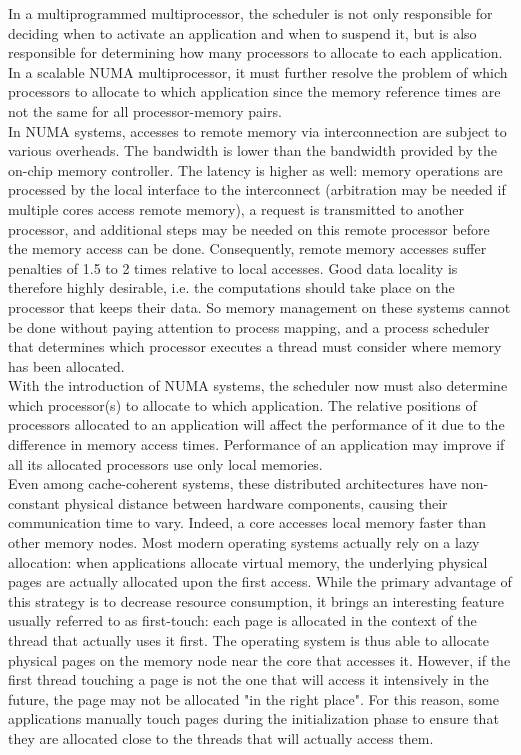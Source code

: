 \documentclass[a4paper,10pt]{article}
\begin{document}
\begin{multicols}{2}
In a multiprogrammed multiprocessor, the scheduler is not only responsible for deciding when to activate an application and when to suspend it, but is also responsible for determining how many processors to allocate to each application. In a scalable NUMA multiprocessor, it must further resolve the problem of which processors to allocate to which application since the memory reference times are not the same for all processor-memory pairs.\\
In NUMA systems, accesses to remote memory via interconnection are subject to various overheads. The bandwidth is lower than the bandwidth provided by the on-chip memory controller. The latency is higher as well: memory operations are processed by the local interface to the interconnect (arbitration may be needed if multiple cores access remote memory), a request is transmitted to another processor, and additional steps may be needed on this remote processor before the memory access can be done. Consequently, remote memory accesses suffer penalties of 1.5 to 2 times relative to local accesses. Good data locality is therefore highly desirable, i.e. the computations should take place on the processor that keeps their data. So memory management on these systems cannot be done without paying attention to process mapping, and a process scheduler that determines which processor executes a thread must consider where memory has been allocated.\\
With the introduction of NUMA systems, the scheduler now must also determine which processor(s) to allocate to which application. The relative positions of processors allocated to an application will affect the performance of it due to the difference in memory access times. Performance of an application may improve if all its allocated processors use only local memories.\\
Even among cache-coherent systems, these distributed architectures have non-constant physical distance between hardware components, causing their communication time to vary. Indeed, a core accesses local memory faster than other memory nodes. Most modern operating systems actually rely on a lazy allocation: when applications allocate virtual memory, the underlying physical pages are actually allocated upon the first access. While the primary advantage of this strategy is to decrease resource consumption, it brings an interesting feature usually referred to as first-touch: each page is allocated in the context of the thread that actually uses it first. The operating system is thus able to allocate physical pages on the memory node near the core that accesses it. However, if the first thread touching a page is not the one that will access it intensively in the future, the page may not be allocated "in the right place". For this reason, some applications manually touch pages during the initialization phase to ensure that they are allocated close to the threads that will actually access them.




\end{multicols}
\end{document}
